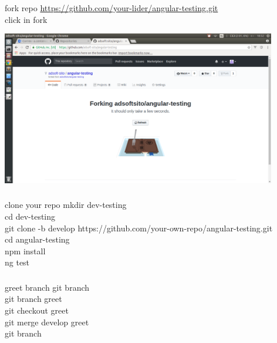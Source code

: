 \documentclass{beamer}
\begin{document}
\begin{frame}\frametitle{} 

\begin{block}{fork repo}
\url{https://github.com/your-lider/angular-testing.git} \\
click in fork
\end{block}

\begin{center}
\includegraphics[width=0.9\textwidth]{forking.png}
\end{center}

\end{frame}


\begin{frame}\frametitle{} 

\begin{block}{clone your repo}
mkdir dev-testing \\
cd dev-testing	 \\
git clone -b develop https://github.com/your-own-repo/angular-testing.git \\
cd angular-testing \\
npm install \\
ng test   
\end{block}

\end{frame}


\begin{frame}\frametitle{} 

\begin{block}{greet branch}
git branch \\
git branch greet \\
git checkout greet \\
git merge develop greet \\
git branch 
\end{block}

\end{frame}
\end{document}
